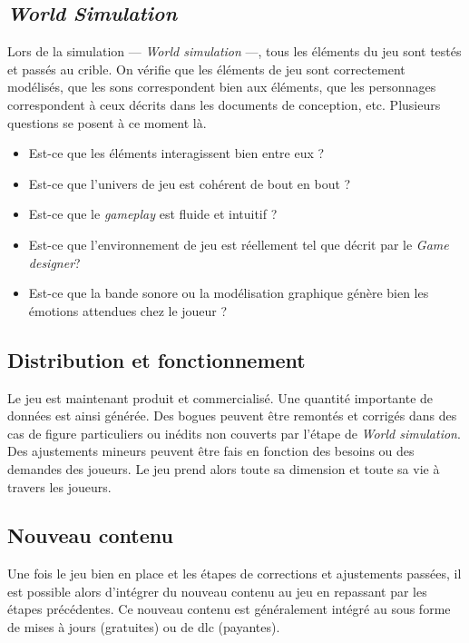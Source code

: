 \subsection{\emph{World Simulation}}





Lors de la simulation --- \emph{World simulation} ---, tous les éléments du jeu sont testés et passés au crible. On vérifie que les éléments de jeu sont correctement modélisés, que les sons correspondent bien aux éléments, que les personnages correspondent à ceux décrits dans les documents de conception, etc. Plusieurs questions se posent à ce moment là. 
\begin{itemize}
    \item Est-ce que les éléments interagissent bien entre eux ?
    \item Est-ce que l'univers de jeu est cohérent de bout en bout ?
    \item Est-ce que le \emph{gameplay} est fluide et intuitif ?
    \item Est-ce que l'environnement de jeu est réellement tel que décrit par le \emph{Game designer}?
    \item Est-ce que la bande sonore ou la modélisation graphique génère bien les émotions attendues chez le joueur ?
\end{itemize}


\subsection{Distribution et fonctionnement}
Le jeu est maintenant produit et commercialisé. Une quantité importante de données est ainsi générée. Des bogues peuvent être remontés et corrigés dans des cas de figure particuliers ou inédits non couverts par l'étape de \emph{World simulation}. Des ajustements mineurs peuvent être fais en fonction des besoins ou des demandes des joueurs. Le jeu prend alors toute sa dimension et toute sa vie à travers les joueurs.

\subsection{Nouveau contenu}
Une fois le jeu bien en place et les étapes de corrections et ajustements passées, il est possible alors d'intégrer du nouveau contenu au jeu en repassant par les étapes précédentes. Ce nouveau contenu est généralement intégré au sous forme de mises à jours (gratuites) ou de \gls{dlc} (payantes).



